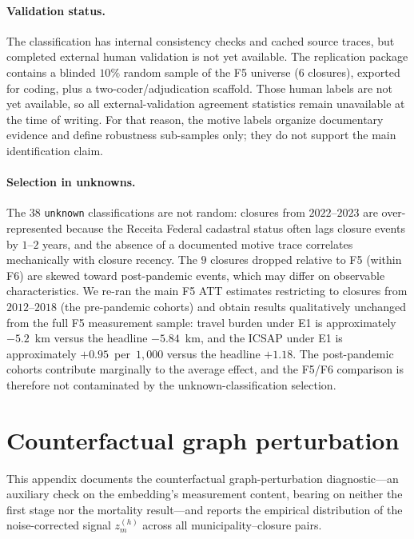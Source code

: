 \paragraph{Validation status.} The classification has internal
consistency checks and cached source traces, but completed external
human validation is not yet available. The replication package contains
a blinded $10\%$ random sample of the F5 universe ($6$ closures),
exported for coding, plus a two-coder/adjudication scaffold. Those human
labels are not yet available, so all external-validation agreement
statistics remain unavailable at the time of writing. For that reason,
the motive labels organize documentary evidence and define robustness
sub-samples only; they do not support the main identification claim.

\paragraph{Selection in unknowns.} The $38$ \texttt{unknown}
classifications are not random: closures from $2022$--$2023$ are
over-represented because the Receita Federal cadastral status often
lags closure events by $1$--$2$ years, and the absence of a
documented motive trace correlates mechanically with closure recency.
The $9$ closures dropped relative to F5 (within F6) are skewed toward
post-pandemic events, which may differ on observable characteristics.
We re-ran the main F5 ATT estimates restricting to closures from
$2012$--$2018$ (the pre-pandemic cohorts) and obtain results
qualitatively unchanged from the full F5 measurement sample: travel burden under E1
is approximately $-5.2$~km versus the headline $-5.84$~km, and the
ICSAP under E1 is approximately $+0.95$~per~$1{,}000$ versus the
headline $+1.18$. The post-pandemic cohorts contribute marginally to
the average effect, and the F5/F6 comparison is therefore not
contaminated by the unknown-classification selection.

\section{Counterfactual graph perturbation}
\label{app:perturbation}

This appendix documents the counterfactual graph-perturbation
diagnostic---an auxiliary check on the embedding's measurement content,
bearing on neither the first stage nor the mortality result---and reports
the empirical distribution of the noise-corrected signal $z_m^{(h)}$
across all municipality--closure pairs.

